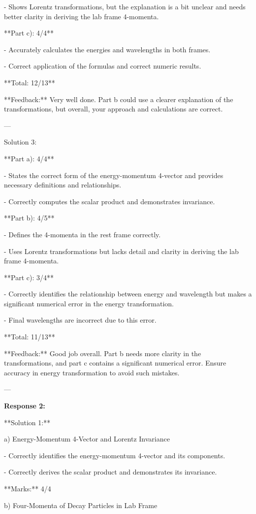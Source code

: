 \documentclass[a4paper,11pt]{article}
\begin{document}
- Shows Lorentz transformations, but the explanation is a bit unclear and needs better clarity in deriving the lab frame 4-momenta.

**Part c): 4/4**

- Accurately calculates the energies and wavelengths in both frames.

- Correct application of the formulas and correct numeric results.

**Total: 12/13**

**Feedback:** Very well done. Part b could use a clearer explanation of the transformations, but overall, your approach and calculations are correct.

---

Solution 3:

**Part a): 4/4**

- States the correct form of the energy-momentum 4-vector and provides necessary definitions and relationships.

- Correctly computes the scalar product and demonstrates invariance.

**Part b): 4/5**

- Defines the 4-momenta in the rest frame correctly.

- Uses Lorentz transformations but lacks detail and clarity in deriving the lab frame 4-momenta.

**Part c): 3/4**

- Correctly identifies the relationship between energy and wavelength but makes a significant numerical error in the energy transformation.

- Final wavelengths are incorrect due to this error.

**Total: 11/13**

**Feedback:** Good job overall. Part b needs more clarity in the transformations, and part c contains a significant numerical error. Ensure accuracy in energy transformation to avoid such mistakes.

---

\bigskip
\textbf{Response 2:}

**Solution 1:**

a) Energy-Momentum 4-Vector and Lorentz Invariance

- Correctly identifies the energy-momentum 4-vector and its components.

- Correctly derives the scalar product and demonstrates its invariance.

**Marks:** 4/4

b) Four-Momenta of Decay Particles in Lab Frame
\end{document}
